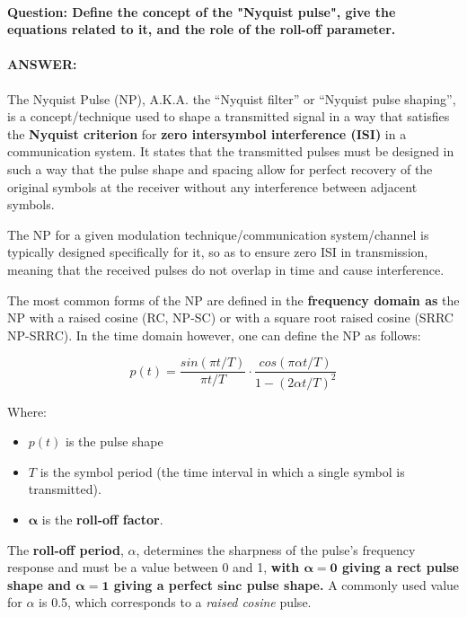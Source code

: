 \documentclass[colorlinks,11pt,a4paper,normalphoto,withhyper,ragged2e]{altareport}
\begin{document}
				\paragraph{Question: Define the concept of the "Nyquist pulse", give the equations related to it, and the role of the roll-off parameter.}
				\paragraph{ANSWER:}
				
				The Nyquist Pulse (NP), A.K.A. the ``Nyquist filter'' or ``Nyquist pulse shaping'', is a concept/technique used to shape a transmitted signal in a way that satisfies the \textbf{Nyquist criterion} for \textbf{zero intersymbol interference (ISI)} in a communication system. It states that the transmitted pulses must be designed in such a way that the pulse shape and spacing allow for perfect recovery of the original symbols at the receiver without any interference between adjacent symbols.\linebreak 
				
				The NP for a given modulation technique/communication system/channel is typically designed specifically for it, so as to ensure zero ISI in transmission, meaning that the received pulses do not overlap in time and cause interference.\linebreak
				
				The most common forms of the NP are defined in the \textbf{frequency domain as} the NP with a raised cosine (RC, NP-SC) or with a square root raised cosine (SRRC NP-SRRC). In the time domain however, one can define the NP as follows:
				
				\begin{equation}
					p(t) = \frac{sin(\pi t / T)}{\pi t / T} \cdot \frac{cos(\pi\alpha t / T)}{1 - (2 \alpha t / T)^2}
				\end{equation}
				
				Where:
				\begin{itemize}[leftmargin=1cm]
					\item $p(t)$ is the pulse shape
					\item $T$ is the symbol period (the time interval in which a single symbol is transmitted).
					\item $\symbf{\alpha}$ is the \textbf{roll-off factor}.
				\end{itemize}
				
				The \textbf{roll-off period}, $\alpha$, determines the sharpness of the pulse's frequency response and must be a value between 0 and 1, \textbf{with $\symbf{\alpha=0}$ giving a rect pulse shape and $\symbf{\alpha=1}$ giving a perfect $\symbf{sinc}$ pulse shape.} A commonly used value for $\alpha$ is 0.5, which corresponds to a \textit{raised cosine} pulse.
				
\end{document}
